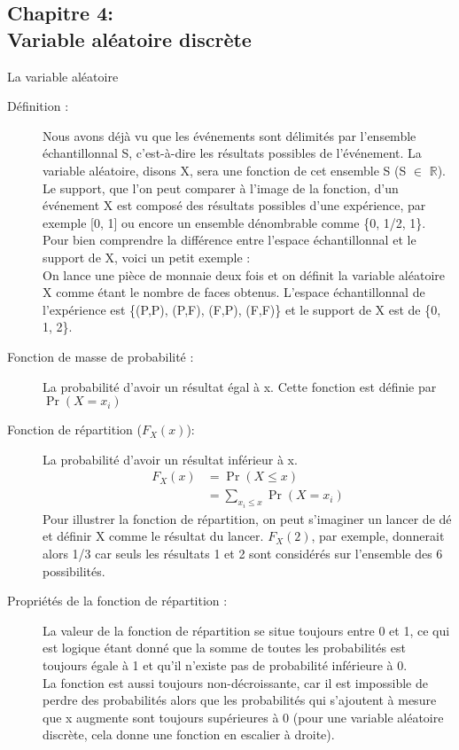 \documentclass[10pt, french]{article}
\begin{document}
\begin{multicols*}{2}
\section{Chapitre 4:\\ Variable aléatoire discrète}
\begin{probch4}{La variable aléatoire}
  \begin{description}
    \item[Définition :] Nous avons déjà vu que les événements sont délimités par l'ensemble échantillonnal S, c'est-à-dire les résultats possibles de l'événement. La variable aléatoire, disons X, sera une fonction de cet ensemble S (S $\in$ $\mathbb{R}$).\\
    Le support, que l'on peut comparer à l'image de la fonction, d'un événement X est composé des résultats possibles d'une expérience, par exemple [0, 1] ou encore un ensemble dénombrable comme \{0, 1/2, 1\}.\\
    Pour bien comprendre la différence entre l'espace échantillonnal et le support de X, voici un petit exemple : \\
    On lance une pièce de monnaie deux fois et on définit la variable aléatoire X comme étant le nombre de faces obtenus. L'espace échantillonnal de l'expérience est \{(P,P), (P,F), (F,P), (F,F)\} et le support de X est de \{0, 1, 2\}.
	\item [Fonction de masse de probabilité :] La probabilité d'avoir un résultat égal à x. Cette fonction est définie par $\Pr(X = x_i)$ 
	\item[Fonction de répartition ($F_{X} (x)$):] La probabilité d'avoir un résultat inférieur à x.
    \begin{align*}
    F_{X} (x) &= \Pr(X \le x) \\
    &= \sum_{x_{i} \le x}^{} \Pr(X = x_{i})
    \end{align*}
    Pour illustrer la fonction de répartition, on peut s'imaginer un lancer de dé et définir X comme le résultat du lancer. $F_{X} (2)$, par exemple, donnerait alors 1/3 car seuls les résultats 1 et 2 sont considérés sur l'ensemble des 6 possibilités. 
    \item[Propriétés de la fonction de répartition :] La valeur de la fonction de répartition se situe toujours entre 0 et 1, ce qui est logique étant donné que la somme de toutes les probabilités est toujours égale à 1 et qu'il n'existe pas de probabilité inférieure à 0. \\
    La fonction est aussi toujours non-décroissante, car il est impossible de perdre des probabilités alors que les probabilités qui s'ajoutent à mesure que x augmente sont toujours supérieures à 0 (pour une variable aléatoire discrète, cela donne une fonction en escalier à droite).\\

\end{description}
\end{probch4}
\end{multicols*}
\end{document}
